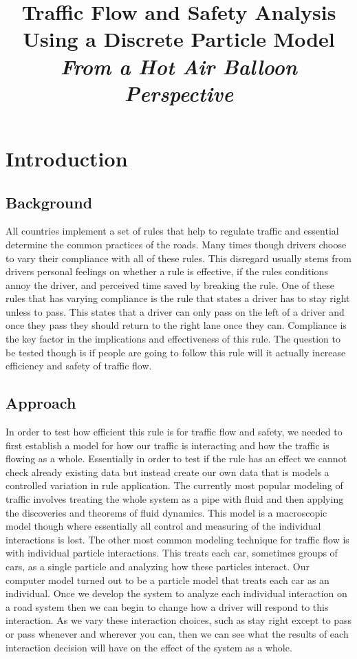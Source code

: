 \documentclass{amsart}
\title{Traffic Flow and Safety Analysis Using a Discrete Particle Model \\ \vspace{1mm} {\small \textit{From a Hot Air Balloon Perspective}}}
\begin{document}

\maketitle

\tableofcontents


\newpage

\section{\bf{Introduction}}

	
	\subsection{Background}
		All countries implement a set of rules that help to regulate traffic and essential determine the common practices of the roads.  Many times though drivers choose to vary their compliance with all of these rules.  This disregard usually stems from drivers personal feelings on whether a rule is effective, if the rules conditions annoy the driver, and perceived time saved by breaking the rule.  One of these rules that has varying compliance is the rule that states a driver has to stay right unless to pass.  This states that a driver can only pass on the left of a driver and once they pass they should return to the right lane once they can.  Compliance is the key factor in the implications and effectiveness of this rule.  The question to be tested though is if people are going to follow this rule will it actually increase efficiency and safety of traffic flow. 
	
	\subsection{Approach}
		In order to test how efficient this rule is for traffic flow and safety, we needed to first establish a model for how our traffic is interacting and how the traffic is flowing as a whole. Essentially in order to test if the rule has an effect we cannot check already existing data but instead create our own data that is models a controlled variation in rule application. The currently most popular modeling of traffic involves treating the whole system as a pipe with fluid and then applying the discoveries and theorems of fluid dynamics.  This model is a macroscopic model though where essentially all control and measuring of the individual interactions is lost.  The other most common modeling technique for traffic flow is with individual particle interactions.  This treats each car, sometimes groups of cars, as a single particle and analyzing how these particles interact.  Our computer model turned out to be a particle model that treats each car as an individual.  Once we develop the system to analyze each individual interaction on a road system then we can begin to change how a driver will respond to this interaction.  As we vary these interaction choices, such as stay right except to pass or pass whenever and wherever you can, then we can see what the results of each interaction decision will have on the effect of the system as a whole.  
\end{document}
